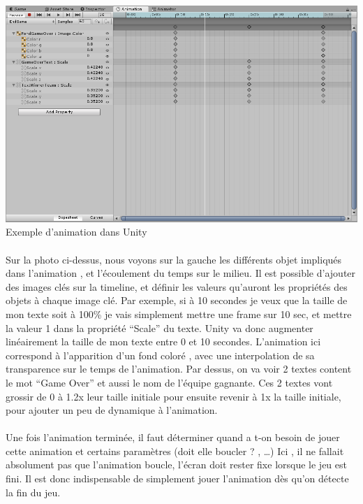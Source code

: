 \documentclass{report}
\begin{document}
\paragraph{}
\begin{center}
\includegraphics[scale=0.5]{DATA/animation.png}
 {Exemple d’animation dans Unity}
\end{center}
\paragraph{}


Sur la photo ci-dessus, nous voyons sur la gauche les différents objet impliqués dans l’animation , et l’écoulement du temps sur le milieu. 
Il est possible d’ajouter des images clés sur la timeline, et définir les valeurs qu’auront les  propriétés des objets à chaque image clé. Par exemple, si à 10 secondes je veux que la taille de mon texte soit à 100\% je vais simplement mettre une frame sur 10 sec, et mettre la valeur 1 dans la propriété “Scale” du texte. Unity va donc augmenter linéairement la taille de mon texte entre 0 et 10 secondes.\newline
L’animation ici correspond à l’apparition d’un fond coloré , avec une interpolation de sa transparence sur le temps de l’animation. Par dessus, on va voir 2 textes content le mot “Game Over” et aussi le nom de l’équipe gagnante. Ces 2 textes vont grossir de 0 à 1.2x leur taille initiale pour ensuite revenir à 1x la taille initiale, pour ajouter un peu de dynamique à l’animation.
\paragraph{}
Une fois l’animation terminée, il faut déterminer quand a t-on besoin de jouer cette animation et certains paramètres (doit elle boucler ? , …)
Ici , il ne fallait absolument pas que l’animation boucle, l’écran doit rester fixe lorsque le jeu est fini. Il est donc indispensable de simplement jouer l’animation dès qu’on détecte la fin du jeu. 
\end{document}

